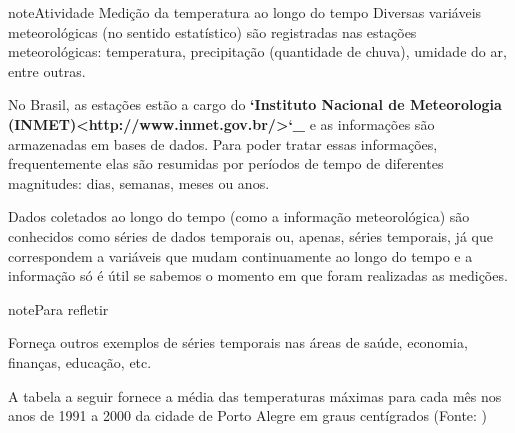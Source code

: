 \begin{sphinxadmonition}{note}{Atividade}{ Medição da temperatura ao longo do tempo}
Diversas variáveis meteorológicas (no sentido estatístico) são registradas nas estações meteorológicas: temperatura, precipitação (quantidade de chuva), umidade do ar, entre outras.

No Brasil, as estações estão a cargo do {\color{red}\bfseries{}{}`Instituto Nacional de Meteorologia (INMET)\textless{}http://www.inmet.gov.br/\textgreater{}{}`\_} e as informações são armazenadas em bases de dados. Para poder tratar essas informações, frequentemente elas são resumidas por períodos de tempo de diferentes magnitudes: dias, semanas, meses ou anos.

Dados coletados ao longo do tempo (como a informação meteorológica) são conhecidos como séries de dados temporais ou, apenas, séries temporais, já que correspondem a variáveis que mudam continuamente ao longo do tempo e a informação só é útil se sabemos o momento em que foram realizadas as medições.
\end{sphinxadmonition}

\begin{sphinxadmonition}{note}{Para refletir}

Forneça outros exemplos de séries temporais nas áreas de saúde, economia, finanças, educação, etc.
\end{sphinxadmonition}

A tabela a seguir fornece a média das temperaturas máximas para cada mês nos anos de 1991 a 2000 da cidade de Porto Alegre em graus centígrados (Fonte: )


